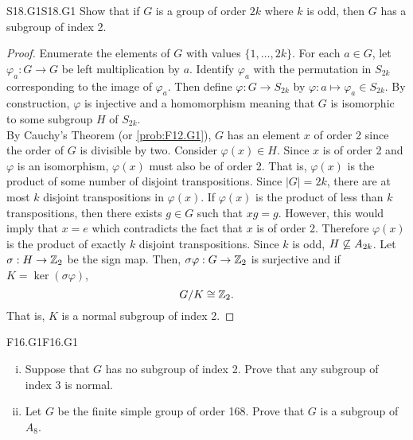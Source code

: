\documentclass[../../AlgebraQualSolutions.tex]{subfiles}
\begin{document}
\begin{prob}{S18.G1}{S18.G1}
    Show that if $G$ is a group of order $2k$ where $k$ is odd, then $G$ has a subgroup of index 2.
\end{prob}

\begin{proof}
    Enumerate the elements of $G$ with values $\{1,\ldots, 2k\}$. For each $a \in G$, let $\varphi_a: G \to G$ be left multiplication by $a$. Identify $\varphi_a$ with the permutation in $S_{2k}$ corresponding to the image of $\varphi_a$. Then define $\varphi: G \to S_{2k}$ by $\varphi: a \mapsto \varphi_{a} \in S_{2k}$. By construction, $\varphi$ is injective and a homomorphism meaning that $G$ is isomorphic to some subgroup $H$ of $S_{2k}$.\\

    By Cauchy's Theorem (or \ref{prob:F12.G1}), $G$ has an element $x$ of order 2 since the order of $G$ is divisible by two. Consider $\varphi(x) \in H$. Since $x$ is of order 2 and $\varphi$ is an isomorphism, $\varphi(x)$ must also be of order 2. That is, $\varphi(x)$ is the product of some number of disjoint transpositions. Since $|G| = 2k$, there are at most $k$ disjoint transpositions in $\varphi(x)$. If $\varphi(x)$ is the product of less than $k$ transpositions, then there exists $g \in G$ such that $xg = g$. However, this would imply that $x = e$ which contradicts the fact that $x$ is of order 2. Therefore $\varphi(x)$ is the product of exactly $k$ disjoint transpositions. Since $k$ is odd, $H \not\subseteq A_{2k}$. Let $\sigma: H \to \mathbb{Z}_2$ be the sign map. Then, $\sigma\varphi: G \to \mathbb{Z}_2$ is surjective and if $K = \ker(\sigma\varphi)$,
        \[G/K \cong \mathbb{Z}_2.\]
    That is, $K$ is a normal subgroup of index 2.
\end{proof}

\begin{prob}{F16.G1}{F16.G1}
    \begin{enumerate}[(i)]
        \item Suppose that $G$ has no subgroup of index 2. Prove that any subgroup of index 3 is normal.
        \item Let $G$ be the finite simple group of order 168. Prove that $G$ is a subgroup of $A_8$.
    \end{enumerate}
\end{prob}
\end{document}
